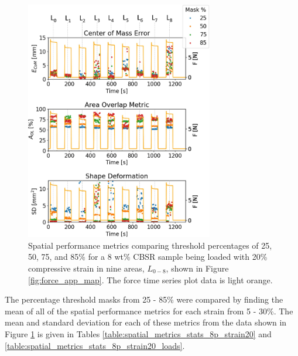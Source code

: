 \begin{figure}[H]
    \centering
    \includegraphics[width=8.2cm]{Figures/CBSR_8p_9push_20strain_60s_4_metrics_thresh_masks_v2_numbd.jpg}
    \caption{Spatial performance metrics comparing threshold percentages of 25, 50, 75, and 85\% for a 8 wt\% CBSR sample being loaded with 20\% compressive strain in nine areas, $L_{0-8}$, shown in Figure \ref{fig:force_app_map}. The force time series plot data is light orange.} %
    \label{fig:recon_perform_8p}
\end{figure}


The percentage threshold masks from 25 - 85\% were compared by finding the mean of all of the spatial performance metrics for each strain from 5 - 30\%. The mean and standard deviation for each of these metrics from the data shown in Figure \ref{fig:recon_perform_8p} is given in Tables \ref{table:spatial_metrics_stats_8p_strain20} and \ref{table:spatial_metrics_stats_8p_strain20_loads}.

